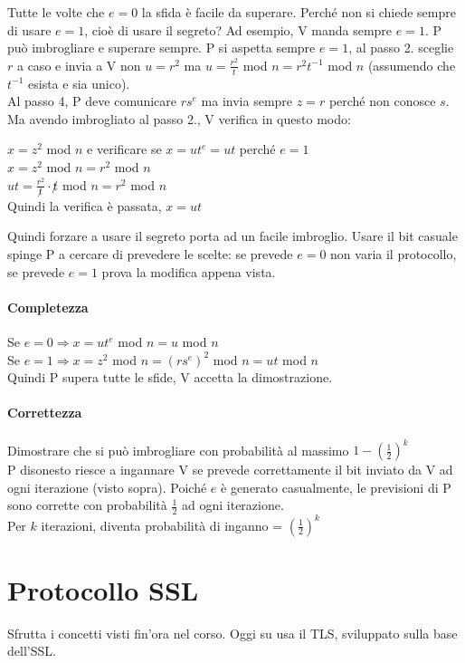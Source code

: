 \documentclass[10pt]{book}
\begin{document}
Tutte le volte che $e=0$ la sfida è facile da superare. Perché non si chiede sempre di usare $e=1$, cioè di usare il segreto? Ad esempio, V manda sempre $e=1$. P può imbrogliare e superare sempre. P si aspetta sempre $e=1$, al passo 2. sceglie $r$ a caso e invia a V non $u=r^2$ ma $u = \frac{r^2}{t}$ mod $n = r^2t^{-1}$ mod $n$ (assumendo che $t^{-1}$ esista e sia unico).\\
Al passo 4, P deve comunicare $rs^e$ ma invia sempre $z = r$ perché non conosce $s$. Ma avendo imbrogliato al passo 2., V verifica in questo modo:
\begin{list}{}{}
	\item $x = z^2$ mod $n$ e verificare se $x = ut^e = ut$ perché $e = 1$\\
	$x = z^2$ mod $n = r^2$ mod $n$\\
	$ut = \frac{r^2}{\not t}\cdot \not t$ mod $n = r^2$ mod $n$\\
	Quindi la verifica è passata, $x=ut$
\end{list}
Quindi forzare a usare il segreto porta ad un facile imbroglio. Usare il bit casuale spinge P a cercare di prevedere le scelte: se prevede $e=0$ non varia il protocollo, se prevede $e=1$ prova la modifica appena vista.
\paragraph{Completezza} Se $e=0\Rightarrow x=ut^e$ mod $n = u$ mod $n$\\
Se $e=1\Rightarrow x= z^2$ mod $n = (rs^e)^2$ mod $n = ut$ mod $n$\\
Quindi P supera tutte le sfide, V accetta la dimostrazione.
\paragraph{Correttezza} Dimostrare che si può imbrogliare con probabilità al massimo $1-\left(\frac{1}{2}\right)^k$\\
P disonesto riesce a ingannare V se prevede correttamente il bit inviato da V ad ogni iterazione (visto sopra). Poiché $e$ è generato casualmente, le previsioni di P sono corrette con probabilità $\frac{1}{2}$ ad ogni iterazione.\\
Per $k$ iterazioni, diventa probabilità di inganno = $\left(\frac{1}{2}\right)^k$
\section{Protocollo SSL}
Sfrutta i concetti visti fin'ora nel corso. Oggi su usa il TLS, sviluppato sulla base dell'SSL.
\end{document}
